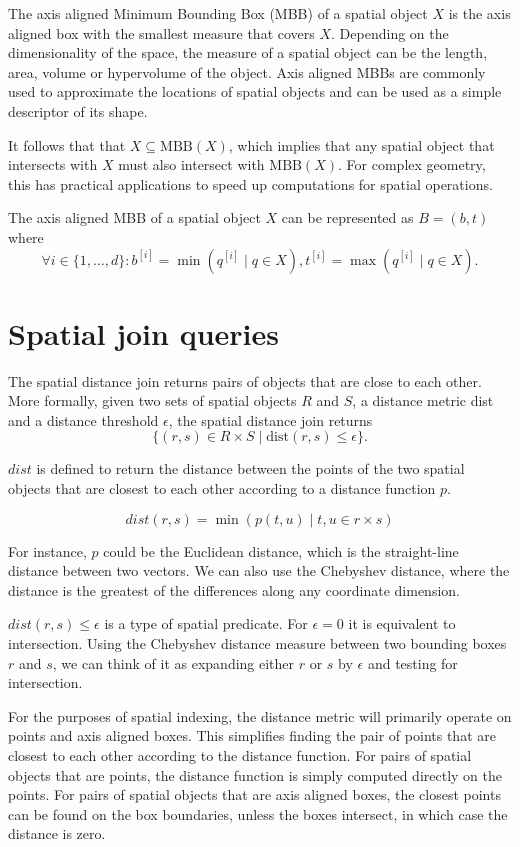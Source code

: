 The axis aligned Minimum Bounding Box (MBB) of a spatial object \(X\) is the axis aligned box with the smallest measure that covers \(X\). Depending on the dimensionality of the space, the measure of a spatial object can be the length, area, volume or hypervolume of the object. Axis aligned MBBs are commonly used to approximate the locations of spatial objects and can be used as a simple descriptor of its shape.

It follows that that \(X \subseteq \textrm{MBB}(X)\), which implies that any spatial object that intersects with \(X\) must also intersect with \(\textrm{MBB}(X)\). For complex geometry, this has practical applications to speed up computations for spatial operations.

The axis aligned MBB of a spatial object \(X\) can be represented as \(B = (b, t)\) where
\[
  \forall i \in \{ 1, \dotsc, d \} :
  b^{[i]} = \min\left( q^{[i]} \mid q \in X \right)
  ,
  t^{[i]} = \max\left( q^{[i]} \mid q \in X \right).
\]

\section{Spatial join queries}

The spatial distance join returns pairs of objects that are close to each other. More formally, given two sets of spatial objects \(R\) and \(S\), a distance metric dist and a distance threshold \(\epsilon\), the spatial distance join returns
\[
  \{ (r, s) \in R \times S \mid \mathrm{dist}(r, s) \leq \epsilon \}.
\]

\(dist\) is defined to return the distance between the points of the two spatial objects that are closest to each other according to a distance function \(p\).

\[
  dist(r, s) = \min\left(p(t, u) \mid t, u \in r \times s \right)
\]

For instance, \(p\) could be the Euclidean distance, which is the straight-line distance between two vectors. We can also use the Chebyshev distance, where the distance is the greatest of the differences along any coordinate dimension.

\(dist(r, s) \leq \epsilon\) is a type of spatial predicate. For \(\epsilon = 0\) it is equivalent to intersection. Using the Chebyshev distance measure between two bounding boxes \(r\) and \(s\), we can think of it as expanding either \(r\) or \(s\) by \(\epsilon\) and testing for intersection.

For the purposes of spatial indexing, the distance metric will primarily operate on points and axis aligned boxes. This simplifies finding the pair of points that are closest to each other according to the distance function. For pairs of spatial objects that are points, the distance function is simply computed directly on the points. For pairs of spatial objects that are axis aligned boxes, the closest points can be found on the box boundaries, unless the boxes intersect, in which case the distance is zero.

